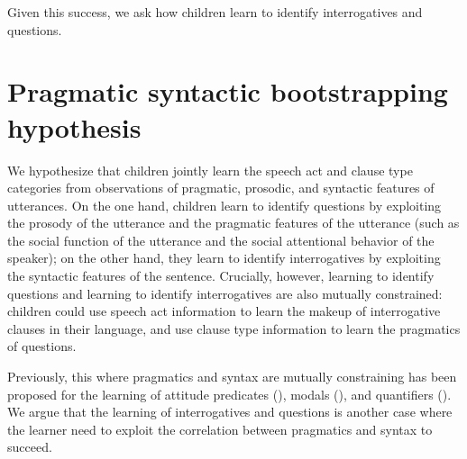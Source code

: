 Given this success, we ask how children learn to identify interrogatives and questions. 

\section{Pragmatic syntactic bootstrapping hypothesis}
\label{sec:intro:prag-syn-bootstrap}



We hypothesize that children jointly learn the speech act and clause type categories from observations of pragmatic, prosodic, and syntactic features of utterances. On the one hand, children learn to identify questions by exploiting the prosody of the utterance and the pragmatic features of the utterance (such as the social function of the utterance and the social attentional behavior of the speaker); on the other hand, they learn to identify interrogatives by exploiting the syntactic features of the sentence. Crucially, however, learning to identify questions and learning to identify interrogatives are also mutually constrained: children could use speech act information to learn the makeup of interrogative clauses in their language, and use clause type information to learn the pragmatics of questions. 


Previously, this \hypos{} where pragmatics and syntax are mutually constraining has been proposed for the learning of attitude predicates (\citealt{dudleyetal2018, hacquardlidz2018}), modals (\citealt{dieuleveut2021}), and quantifiers (\citealt{knowlton2021}). We argue that the learning of interrogatives and questions is another case where the learner need to exploit the correlation between pragmatics and syntax to succeed.  






